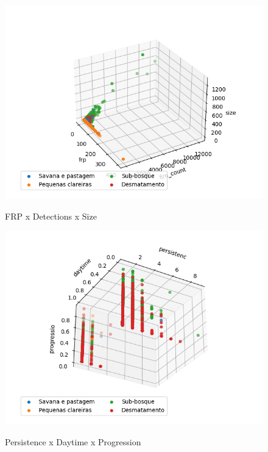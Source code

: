 \begin{multicols}{2}
\begin{figure}[H]
    \caption{FRP x Detections x Size}
     
    \centering 
    \includegraphics[width=1.1\linewidth]{tg1/figuras/frpxfire_countxsize-30--30.png}
    \label{figura:four}
\end{figure}

\begin{figure}[H]
    \caption{Persistence x Daytime x Progression}
     
    \centering 
    \includegraphics[width=1.1\linewidth]{tg1/figuras/persistencxdaytimexprogressio--30--120.png}
    \label{figura:five}
\end{figure}


\end{multicols}
